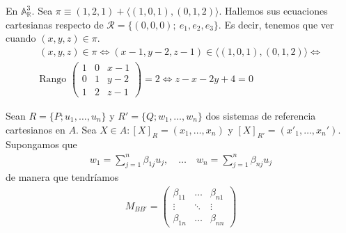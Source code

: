 \documentclass[14pt]{book}
\begin{document}
\begin{ej}
	En $\mathbb{A}^3_\mathbb{R}$. Sea $\pi \equiv (1,2,1) + \langle (1,0,1), (0,1,2) \rangle$. Hallemos sus ecuaciones cartesianas respecto de $\mathcal{R} = \{(0,0,0);\ e_1, e_2, e_3\}$. Es decir, tenemos que ver cuando $(x, y, z) \in \pi$.
	\begin{multline*}
	(x,y,z) \in \pi \iff (x-1, y -2, z-1) \in \langle (1,0,1), (0,1,2) \rangle \iff\\
	\text{Rango }\left(\begin{array}{ccc}
	1 & 0 & x - 1 \\
	0 & 1 & y - 2 \\
	1 & 2&  z - 1
	\end{array}\right) = 2 \iff
	z - x - 2y + 4 = 0
	\end{multline*}
\end{ej}

Sean $R = \{P; u_1, \dots, u_n\}$ y $R' = \{Q; w_1, \dots, w_n\}$ dos sistemas de referencia cartesianos en $A$. Sea $X \in A: [X]_R = (x_1, \dots, x_n)$ y $[X]_{R'} = (x'_1, \dots, x_n')$. Supongamos que
\begin{align*}
	w_1 = \sum_{j=1}^{n} \beta_{1j} u_j,\quad \dots \quad w_n = \sum_{j=1}^n \beta_{nj} u_j
\end{align*}
de manera que tendríamos
\begin{align*}
	M_{BB'} = \left(\begin{array}{ccc}
		\beta_{11} & \dots  & \beta_{n1} \\
		  \vdots   & \ddots &   \vdots   \\
		\beta_{1n} & \dots  & \beta_{nn}
	\end{array}
	\right)
\end{align*}
\end{document}
